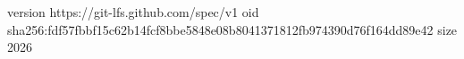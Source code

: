 version https://git-lfs.github.com/spec/v1
oid sha256:fdf57fbbf15c62b14fcf8bbe5848e08b8041371812fb974390d76f164dd89e42
size 2026
